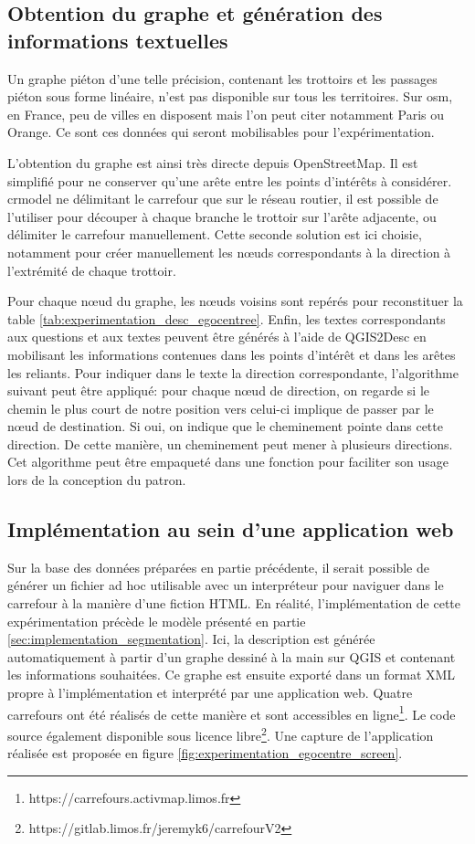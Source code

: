 \subsection{Obtention du graphe et génération des informations textuelles}

Un graphe piéton d'une telle précision, contenant les trottoirs et les passages piéton sous forme linéaire, n'est pas disponible sur tous les territoires. Sur \gls{osm}, en France, peu de villes en disposent mais l'on peut citer notamment Paris ou Orange. Ce sont ces données qui seront mobilisables pour l'expérimentation. 

\newpar{}

L'obtention du graphe est ainsi très directe depuis OpenStreetMap. Il est simplifié pour ne conserver qu'une arête entre les points d'intérêts à considérer. crmodel ne délimitant le carrefour que sur le réseau routier, il est possible de l'utiliser pour découper à chaque branche le trottoir sur l'arête adjacente, ou délimiter le carrefour manuellement. Cette seconde solution est ici choisie, notamment pour créer manuellement les nœuds correspondants à la direction à l'extrémité de chaque trottoir.

\newpar{}

Pour chaque nœud du graphe, les nœuds voisins sont repérés pour reconstituer la table \ref{tab:experimentation_desc_egocentree}. Enfin, les textes correspondants aux questions et aux textes peuvent être générés à l'aide de QGIS2Desc en mobilisant les informations contenues dans les points d'intérêt et dans les arêtes les reliants. Pour indiquer dans le texte la direction correspondante, l'algorithme suivant peut être appliqué: pour chaque nœud de direction, on regarde si le chemin le plus court de notre position vers celui-ci implique de passer par le nœud de destination. Si oui, on indique que le cheminement pointe dans cette direction. De cette manière, un cheminement peut mener à plusieurs directions. Cet algorithme peut être empaqueté dans une fonction pour faciliter son usage lors de la conception du patron.

\subsection{Implémentation au sein d'une application web}

Sur la base des données préparées en partie précédente, il serait possible de générer un fichier ad hoc utilisable avec un interpréteur pour naviguer dans le carrefour à la manière d'une fiction HTML. En réalité, l'implémentation de cette expérimentation précède le modèle présenté en partie \ref{sec:implementation_segmentation}. Ici, la description est générée automatiquement à partir d'un graphe dessiné à la main sur QGIS et contenant les informations souhaitées. Ce graphe est ensuite exporté dans un format XML propre à l'implémentation et interprété par une application web. Quatre carrefours ont été réalisés de cette manière et sont accessibles en ligne\footnote{https://carrefours.activmap.limos.fr}. Le code source également disponible sous licence libre\footnote{https://gitlab.limos.fr/jeremyk6/carrefourV2}. Une capture de l'application réalisée est proposée en figure \ref{fig:experimentation_egocentre_screen}.

